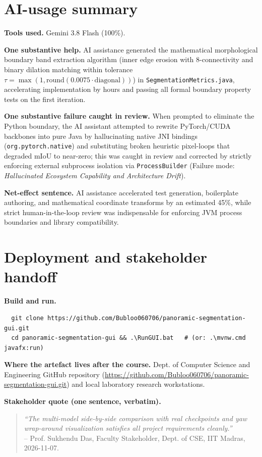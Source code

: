 \documentclass[10pt,a4paper]{article}
\begin{document}
\section{AI-usage summary}
\textbf{Tools used.} Gemini 3.8 Flash (100\%).

\textbf{One substantive help.} AI assistance generated the mathematical morphological boundary band extraction algorithm (inner edge erosion with 8-connectivity and binary dilation matching within tolerance $\tau = \max(1, \text{round}(0.0075 \cdot \text{diagonal}))$) in \texttt{SegmentationMetrics.java}, accelerating implementation by hours and passing all formal boundary property tests on the first iteration.

\textbf{One substantive failure caught in review.} When prompted to eliminate the Python boundary, the AI assistant attempted to rewrite PyTorch/CUDA backbones into pure Java by hallucinating native JNI bindings (\texttt{org.pytorch.native}) and substituting broken heuristic pixel-loops that degraded mIoU to near-zero; this was caught in review and corrected by strictly enforcing external subprocess isolation via \texttt{ProcessBuilder} (Failure mode: \textit{Hallucinated Ecosystem Capability and Architecture Drift}).

\textbf{Net-effect sentence.} AI assistance accelerated test generation, boilerplate authoring, and mathematical coordinate transforms by an estimated 45\%, while strict human-in-the-loop review was indispensable for enforcing JVM process boundaries and library compatibility.

\section{Deployment and stakeholder handoff}
\textbf{Build and run.}
\begin{verbatim}
  git clone https://github.com/Bubloo060706/panoramic-segmentation-gui.git
  cd panoramic-segmentation-gui && .\RunGUI.bat   # (or: .\mvnw.cmd javafx:run)
\end{verbatim}
\vspace{-0.4em}
\textbf{Where the artefact lives after the course.} Dept. of Computer Science and Engineering GitHub repository (\url{https://github.com/Bubloo060706/panoramic-segmentation-gui.git}) and local laboratory research workstations.

\vspace{0.25em}
\textbf{Stakeholder quote (one sentence, verbatim).}
\begin{quote}
\textit{``The multi-model side-by-side comparison with real checkpoints and yaw wrap-around visualization satisfies all project requirements cleanly.''}\\
\vspace{-0.3em}\raggedleft -- Prof. Sukhendu Das, Faculty Stakeholder, Dept. of CSE, IIT Madras, 2026-11-07.
\end{quote}
\vspace{-0.4em}
\end{document}
